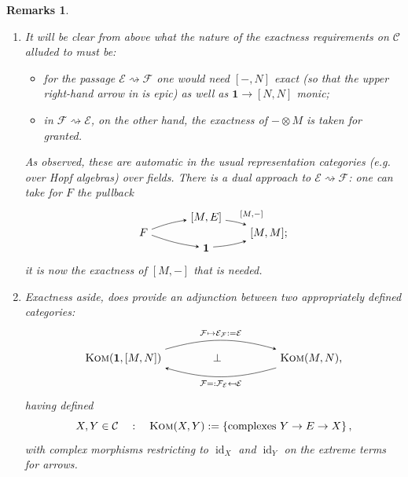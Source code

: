 \documentclass[11pt,leqno]{article}
\theoremstyle{plain}
\theoremstyle{plain}
\theoremstyle{plain}
\newtheorem{remarks}[lemma]{Remarks}
\numberwithin{equation}{section}
\theoremstyle{nonumberplain}
\newcommand\cC{{\mathcal C}}
\newcommand\cE{{\mathcal E}}
\newcommand\cF{{\mathcal F}}
\newcommand\1{{\bf 1}}
\DeclareMathOperator{\id}{id}
\newcommand{\cat}[1]{\textsc{#1}}
\begin{document}
\begin{remarks}
\begin{enumerate}[(1),wide]
  \item\label{item:res:derived.duality:which.conds} It will be clear from  above what the nature of the exactness requirements on $\cC$ alluded to must be:
    \begin{itemize}[wide]
    \item for the passage $\cE \rightsquigarrow \cF$ one would need $[-,N]$ exact (so that the upper right-hand arrow in  is epic) as well as $\mathbf{1}\to [N,N]$ monic;
    \item in $\cF\rightsquigarrow \cE$, on the other hand, the exactness of $-\otimes M$ is taken for granted.
    \end{itemize}
    As observed, these are automatic in the usual representation categories (e.g. over Hopf algebras) over fields. There is a dual approach to $\cE\rightsquigarrow \cF$: one can take for $F$ the pullback
    \begin{equation*}
      \begin{tikzpicture}[>=stealth,auto,baseline=(current  bounding  box.center)]
        \path[anchor=base] 
        (0,0) node (l) {$F$}
        +(2,.5) node (u) {$[M,E]$}
        +(2,-.5) node (d) {$\mathbf{1}$}
        +(4,0) node (r) {$[M,M]$;}
        ;
        \draw[->] (l) to[bend left=6] node[pos=.5,auto] {$\scriptstyle $} (u);
        \draw[->] (u) to[bend left=6] node[pos=.5,auto] {$\scriptstyle [M,-]$} (r);
        \draw[->] (l) to[bend right=6] node[pos=.5,auto,swap] {$\scriptstyle $} (d);
        \draw[->] (d) to[bend right=6] node[pos=.5,auto,swap] {$\scriptstyle $} (r);
      \end{tikzpicture}
    \end{equation*}
    it is now the exactness of $[M,-]$ that is needed.

  \item\label{item:res:derived.duality:kom.adj} Exactness aside,  does provide an adjunction between two appropriately defined categories:
    \begin{equation*}
      \begin{tikzpicture}[>=stealth,auto,baseline=(current  bounding  box.center)]
        \path[anchor=base] 
        (0,0) node (l) {$\cat{Kom}(\mathbf{1},[M,N])$}
        +(6,0) node (r) {$\cat{Kom}(M,N)$,}
        +(3,0) node () {$\bot$}
        ;
        \draw[->] (l.north east) to[bend left=16] node[pos=.5,auto] {$\scriptstyle \cF\mapsto \cE_{\cF}:=\cE$} (r.north west);
        \draw[->] (r.south west) to[bend left=16] node[pos=.5,auto] {$\scriptstyle \cF=:\cF_{\cE}\mapsfrom \cE$} (l.south east);
      \end{tikzpicture}
    \end{equation*}
    having defined 
    \begin{equation*}
      X,Y\in \cC\quad:\quad
      \cat{Kom}(X,Y)
      :=
      \left\{\text{complexes }Y\to E\to X\right\},
    \end{equation*}
    with complex morphisms restricting to $\id_X$ and $\id_Y$ on the extreme terms for arrows.
  \end{enumerate}
\end{remarks}
\end{document}
